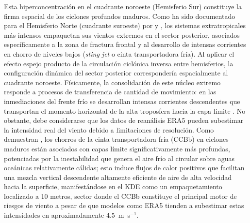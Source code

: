 Esta hiperconcentración en el cuadrante noroeste (Hemisferio Sur) constituye la firma espacial de los ciclones profundos maduros. Como ha sido documentado para el Hemisferio Norte (cuadrante suroeste) por \citet{clark2005sting} y \citet{han2025system}, los sistemas extratropicales más intensos empaquetan sus vientos extremos en el sector posterior, asociados específicamente a la zona de fractura frontal y al desarrollo de intensas corrientes en chorro de niveles bajos (\textit{sting jet} o cinta transportadora fría). Al aplicar el efecto espejo producto de la circulación ciclónica inversa entre hemisferios, la configuración dinámica del sector posterior correspondería espacialmente al cuadrante noroeste. Físicamente, la consolidación de este núcleo extremo responde a procesos de transferencia de cantidad de movimiento: en las inmediaciones del frente frío se desarrollan intensas corrientes descendentes que transportan el momento horizontal de la alta troposfera hacia la capa límite \citep{hyeok2024extrem}. No obstante, debe considerarse que los datos de reanálisis ERA5 pueden subestimar la intensidad real del viento debido a limitaciones de resolución. Como demuestran \citet{gentile2023}, los chorros de la cinta transportadora fría (CCBb) en ciclones maduros están asociados con capas límite significativamente más profundas, potenciadas por la inestabilidad que genera el aire frío al circular sobre aguas oceánicas relativamente cálidas; esto induce flujos de calor positivos que facilitan una mezcla vertical descendente altamente eficiente de aire de alta velocidad hacia la superficie, manifestándose en el KDE como un empaquetamiento localizado a 10 metros, sector donde el CCBb constituye el principal motor de riesgos de viento a pesar de que modelos como ERA5 tienden a subestimar estas intensidades en aproximadamente 4.5~m~s$^{-1}$.

